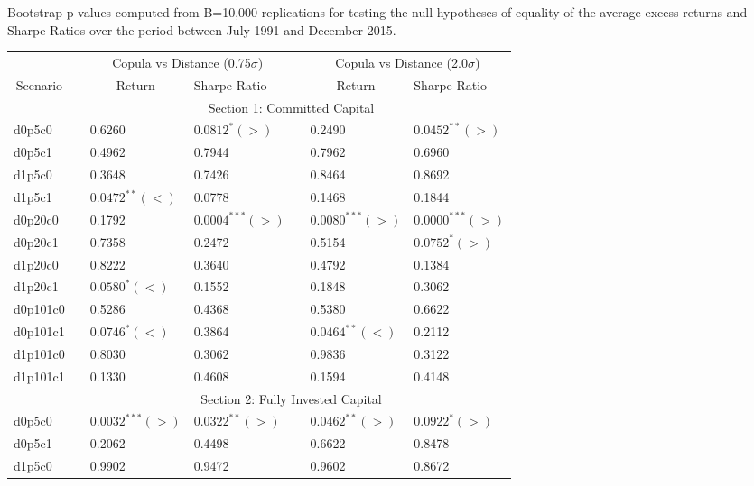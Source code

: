 \documentclass[a4paper]{article}
\begin{document}
	\begin{threeparttable}[H]
		\centering \scriptsize
		\caption{Bootstrap p-values computed from B=10,000 replications for testing the null hypotheses of equality of the average excess returns and Sharpe Ratios over the period between July 1991 and December 2015.}
		\begin{tabularx}{\textwidth}{@{\extracolsep{\fill}}lllllll@{}}
			\toprule
			& & \multicolumn{2}{c}{Copula vs Distance (0.75$\sigma$)} & \multicolumn{1}{c}{} & \multicolumn{2}{c}{Copula vs Distance (2.0$\sigma$)} \\
			\cmidrule{3-4}  \cmidrule{6-7}
			\multicolumn{1}{c}{Scenario} & & \multicolumn{1}{c}{Return} & Sharpe Ratio &       & \multicolumn{1}{c}{Return}& Sharpe Ratio \\
			\midrule
			& \multicolumn{6}{c}{Section 1: Committed Capital} \\
			\midrule
					d0p5c0 & & 0.6260 & $0.0812^{*}(>)$ &       & 0.2490 & $0.0452^{**}(>)$ \\
			d0p5c1 & & 0.4962 & 0.7944 &       & 0.7962 & 0.6960 \\
			d1p5c0 & & 0.3648 & 0.7426 &       & 0.8464 & 0.8692 \\
			d1p5c1 & & $0.0472^{**}(<)$ & 0.0778 &       & 0.1468 & 0.1844 \\
			d0p20c0 & & 0.1792 & $0.0004^{***}(>)$ &       & $0.0080^{***}(>)$ & $0.0000^{***}(>)$ \\
			d0p20c1 & & 0.7358 & 0.2472 &       & 0.5154 & $0.0752^{*}(>)$ \\
			d1p20c0 & & 0.8222 & 0.3640 &       & 0.4792 & 0.1384 \\
			d1p20c1 & & $0.0580^{*}(<)$ & 0.1552 &       & 0.1848 & 0.3062 \\
			d0p101c0 & & 0.5286 & 0.4368 &       & 0.5380 & 0.6622 \\
			d0p101c1 & & $0.0746^{*}(<)$ & 0.3864 &       & $0.0464^{**}(<)$ & 0.2112 \\
			d1p101c0 & & 0.8030 & 0.3062 &       & 0.9836 & 0.3122 \\
			d1p101c1 & & 0.1330 & 0.4608 &       & 0.1594 & 0.4148 \\
			\midrule
			& \multicolumn{6}{c}{Section 2: Fully Invested Capital} \\
			\midrule
			d0p5c0 & & $0.0032^{***}(>)$ & $0.0322^{**}(>)$ &       & $0.0462^{**}(>)$ & $0.0922^{*}(>)$ \\
			d0p5c1 & & 0.2062 & 0.4498 &       & 0.6622 & 0.8478 \\
			d1p5c0 & & 0.9902 & 0.9472 &       & 0.9602 & 0.8672 \\

\end{tabularx}
\end{threeparttable}
\end{document}
